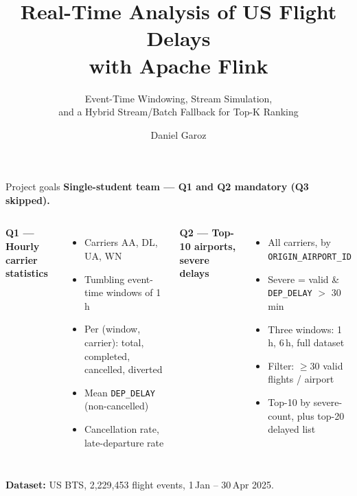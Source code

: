 \documentclass[aspectratio=169,10pt]{beamer}
\title[SABD Project 2]{Real-Time Analysis of US Flight Delays\\ with Apache Flink}
\subtitle{Event-Time Windowing, Stream Simulation,\\
  and a Hybrid Stream/Batch Fallback for Top-K Ranking}
\author[Daniel Garoz]{Daniel Garoz}
\institute[Tor Vergata]{Universit\`a degli Studi di Roma Tor Vergata \\
  SABD Project 2 \textbar{} A.A.\ 2025/26}
\date{}
\begin{document}
\begin{frame}[plain]
  \titlepage
\end{frame}

\begin{frame}{Project goals}
\textbf{Single-student team — Q1 and Q2 mandatory (Q3 skipped).}
\vspace{0.5em}

\begin{columns}[T,onlytextwidth]
{\color{sabdNavy}\textbf{Q1 — Hourly carrier statistics}}
\begin{itemize}\small
  \item Carriers AA, DL, UA, WN
  \item Tumbling event-time windows of 1\,h
  \item Per (window, carrier): total, completed, cancelled, diverted
  \item Mean \texttt{DEP\_DELAY} (non-cancelled)
  \item Cancellation rate, late-departure rate
\end{itemize}

{\color{sabdOrange}\textbf{Q2 — Top-10 airports, severe delays}}
\begin{itemize}\small
  \item All carriers, by \texttt{ORIGIN\_AIRPORT\_ID}
  \item Severe = valid \& \texttt{DEP\_DELAY} $>$ 30\,min
  \item Three windows: 1\,h, 6\,h, full dataset
  \item Filter: $\geq 30$ valid flights / airport
  \item Top-10 by severe-count, plus top-20 delayed list
\end{itemize}
\end{columns}

\vspace{1em}
\centerline{\footnotesize\textbf{Dataset:} US BTS, 2{,}229{,}453 flight events, 1\,Jan – 30\,Apr 2025.}
\end{frame}
\end{document}
